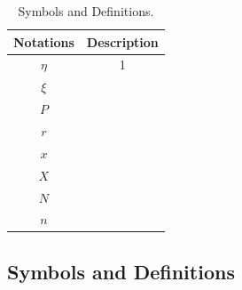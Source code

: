 \documentclass[12pt,a4paper]{article}
\begin{document}
\begin{spacing}{1.2}
\begin{table}[H]
\renewcommand{\arraystretch}{1.5}
\caption{Symbols and Definitions.}
\label{Table_Symbols}
\begin{center}
{\footnotesize
\begin{tabular}{c c}
\toprule
{Notations} & {Description} \\
\midrule
{$\eta$}    & {1} \\ 
{$\xi$}     & {} \\ 
$P$   & {} \\ 
$r$     & {} \\
$x$     & {} \\ 
$X$     & {} \\ 
$N$    & {} \\ 
$n$     & {} \\ 
\bottomrule
\end{tabular}}
\end{center}
\end{table}


\subsection{Symbols and Definitions}


\end{spacing}
\end{document}
